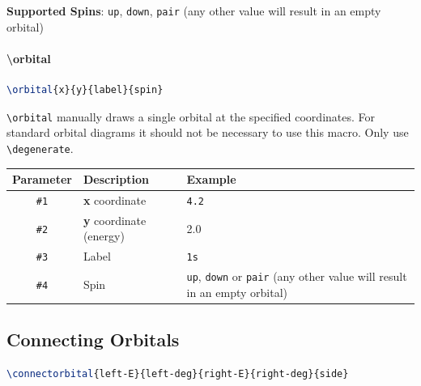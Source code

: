\documentclass[12pt, a4paper]{article}
\begin{document}
\textbf{Supported Spins}: \texttt{up}, \texttt{down}, \texttt{pair} (any other value will result in an empty orbital)

\paragraph{\textbackslash orbital}

\begin{lstlisting}[language=TeX]
\orbital{x}{y}{label}{spin}
\end{lstlisting}

\noindent \texttt{\textbackslash orbital} manually draws a single orbital at the specified coordinates. For standard orbital diagrams it should not be necessary to use this macro. Only use \texttt{\textbackslash degenerate}.

\begin{center}
    \begin{tabular}{|c| p{7cm} |p{3cm}|}
        \hline
        Parameter    & Description                    & Example                                                                                       \\ [0.5ex]
        \hline%
        \texttt{\#1} & \textbf{x} coordinate          & \texttt{4.2}                                                                                  \\
        \hline
        \texttt{\#2} & \textbf{y} coordinate (energy) & {2.0}
        \\
        \hline
        \texttt{\#3} & Label                          & \texttt{1s}                                                                                   \\
        \hline
        \texttt{\#4} & Spin                           & \texttt{up}, \texttt{down} or \texttt{pair} (any other value will result in an empty orbital) \\ [1ex]
        \hline
    \end{tabular}
\end{center}

\subsection{Connecting Orbitals}

\begin{lstlisting}[language=TeX]
\connectorbital{left-E}{left-deg}{right-E}{right-deg}{side}
\end{lstlisting}
\end{document}

